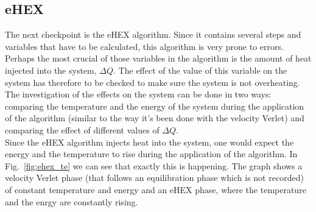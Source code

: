 \documentclass[12pt]{article}
\begin{document}
\subsection{eHEX}
The next checkpoint is the eHEX algorithm. Since it contains several steps and variables that have to be calculated, this algorithm is very prone
to errors. Perhaps the most crucial of those variables in the algorithm is the amount of heat injected into the system, $\Delta Q$. 
The effect of the value of this variable on the system has therefore to be checked to make sure the system is not overheating.\\
The investigation of the effects on the system can be done in two ways: comparing the temperature and the energy of the system during the 
application of the algorithm (similar to the way it's been done with the velocity Verlet) and comparing the effect of different values of $\Delta Q$.\\
Since the eHEX algorithm injects heat into the system, one would expect the energy and the temperature to rise during the application of the
algorithm. In Fig.~\ref{fig:ehex_te} we can see that exactly this is happening. The graph shows a velocity Verlet phase (that follows an equilibration
phase which is not recorded) of constant temperature and energy and an eHEX phase, where the temperature and the enrgy are constantly rising. 
\end{document}
